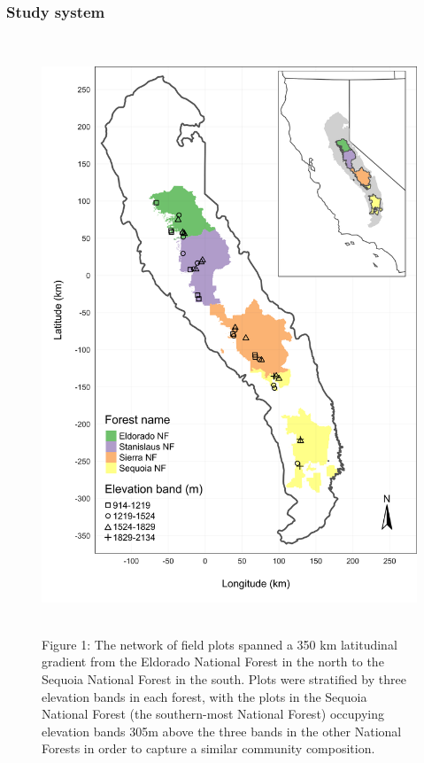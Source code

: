 \documentclass[]{article}
\begin{document}
\hypertarget{study-system}{%
\subsubsection{Study system}\label{study-system}}

\begin{figure}
\centering
\includegraphics[width=\textwidth,height=7in]{../../figures/study-geographic-extent-inset.png}
\caption{Figure 1: The network of field plots spanned a 350 km
latitudinal gradient from the Eldorado National Forest in the north to
the Sequoia National Forest in the south. Plots were stratified by three
elevation bands in each forest, with the plots in the Sequoia National
Forest (the southern-most National Forest) occupying elevation bands
305m above the three bands in the other National Forests in order to
capture a similar community composition.}
\end{figure}
\end{document}
